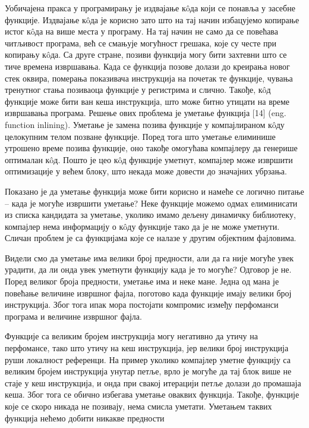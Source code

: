 \documentclass[12pt,oneside]{memoir}
\begin{document}
Уобичајена пракса у програмирању је издвајање к\^{o}да који се понавља у 
засебне функције.
Издвајање к\^{o}да је корисно зато што на тај начин избацујемо копирање
истог к\^{o}да на више места у програму.
На тај начин не само да се повећава читљивост програма, већ се смањује
могућност грешака, које су честе при копирању  к\^{o}да.
Са друге стране, позиви функција могу бити захтевни што се тиче времена извршавања.
Када се функција позове долази до креирања новог стек оквира, померања показивача
инструкција на почетак те функције, чувања тренутног стања позиваоца функције у 
регистрима и слично.
Такође,  к\^{o}д функције може бити ван кеша инструкција, што може битно
утицати на време извршавања програма.
Решење ових проблема је уметање функција [14] (eng. function inlining).
Уметање је замена позива функције у компајлираном к\^{o}ду
целокупним телом позване функције.
Поред тога што уметање елиминише утрошено време позива функције, оно такође
омогућава компајлеру да генерише оптималан к\^{o}д.
Пошто је цео к\^{o}д функције уметнут, компајлер може извршити оптимизације у већем
блоку, што некада може довести до значајних убрзања.
\par
Показано је да уметање функција може бити корисно и намеће се логично питање --
када је могуће извршити уметање?
Неке функције можемо одмах елиминисати из списка кандидата за уметање, уколико имамо дељену динамичку библиотеку, компајлер нема
информацију о к\^{o}ду функције тако да је не може уметнути.
Сличан проблем је са функцијама које се налазе у другим објектним фајловима.
\par 
Видели смо да уметање има велики број предности, али да га није могуће увек
урадити, да ли онда увек уметнути функцију када је то могуће?
Одговор је не. 
Поред великог броја предности, уметање има и неке мане.
Једна од мана је повећање величине извршног фајла, поготово када функције имају
велики број инструкција.
Због тога ипак мора постојати компромис између перфоманси програма и величине
извршног фајла.
\par
Функције са великим бројем инструкција могу негативно да утичу на перфомансе, тако
што утичу на кеш инструкција, јер велики број инструкција руши локалност референци. 
На пример уколико компајлер уметне функцију са великим бројем инструкција 
унутар петље, врло је могуће да тај блок више не стаје у кеш инструкција,
и онда при свакој итерацији петље долази до промашаја кеша. Због тога се
обично избегава уметање оваквих функција.
Такође, функције које се скоро никада не  позивају, нема смисла уметати.
Уметањем таквих функција нећемо добити никакве предности
\end{document}
